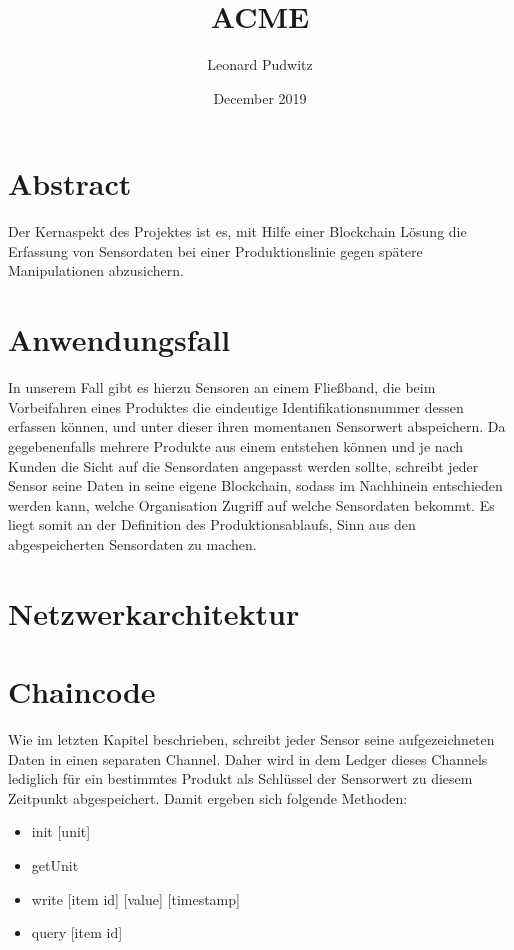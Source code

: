 \documentclass{article}
\title{ACME}
\author{Leonard Pudwitz}
\date{December 2019}
\begin{document}
\maketitle
\newpage

\section{Abstract}
Der Kernaspekt des Projektes ist es, mit Hilfe einer Blockchain Lösung die Erfassung von Sensordaten bei einer Produktionslinie gegen spätere Manipulationen abzusichern. 

\section{Anwendungsfall}
In unserem Fall gibt es hierzu Sensoren an einem Fließband, die beim Vorbeifahren eines Produktes die eindeutige Identifikationsnummer dessen erfassen können, und unter dieser ihren momentanen Sensorwert abspeichern.
Da gegebenenfalls mehrere Produkte aus einem entstehen können und je nach Kunden die Sicht auf die Sensordaten angepasst werden sollte, schreibt jeder Sensor seine Daten in seine eigene Blockchain, sodass im Nachhinein entschieden werden kann, welche Organisation Zugriff auf welche Sensordaten bekommt. Es liegt somit an der Definition des Produktionsablaufs, Sinn aus den abgespeicherten Sensordaten zu machen.

\section{Netzwerkarchitektur}

\section{Chaincode} %
Wie im letzten Kapitel beschrieben, schreibt jeder Sensor seine aufgezeichneten Daten in einen separaten Channel. Daher wird in dem Ledger dieses Channels lediglich für ein bestimmtes Produkt als Schlüssel der Sensorwert zu diesem Zeitpunkt abgespeichert. Damit ergeben sich folgende Methoden:
\begin{itemize}
    \item init [unit]
    \item getUnit
    \item write [item id] [value] [timestamp]
    \item query [item id]
\end{itemize}{}
\end{document}
